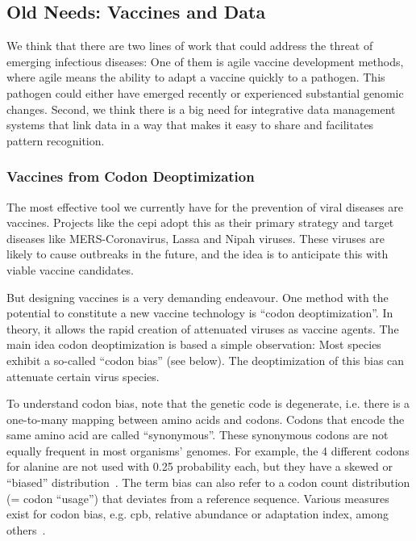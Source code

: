 \subsection{Old Needs: Vaccines and Data}

We think that there are two lines of work that could address the threat of emerging infectious diseases: One of them is agile vaccine development methods, where agile means the ability to adapt a vaccine quickly to a pathogen. This pathogen could either have emerged recently or experienced substantial genomic changes. Second, we think there is a big need for integrative data management systems that link data in a way that makes it easy to share and facilitates pattern recognition.


\subsubsection{Vaccines from Codon Deoptimization}

The most effective tool we currently have for the prevention of viral diseases are vaccines. Projects like the \gls{cepi} adopt this as their primary strategy and target diseases like MERS-Coronavirus, Lassa and Nipah viruses. These viruses are likely to cause outbreaks in the future, and the idea is to anticipate this with viable vaccine candidates.

But designing vaccines is a very demanding endeavour. One method with the potential to constitute a new vaccine technology is ``codon deoptimization''. In theory, it allows the rapid creation of attenuated viruses as vaccine agents. The main idea codon deoptimization is based a simple observation: Most species exhibit a so-called ``codon bias'' (see below). The deoptimization of this bias can attenuate certain virus species.

To understand codon bias, note that the genetic code is degenerate, i.e. there is a one-to-many mapping between amino acids and codons. Codons that encode the same amino acid are called ``synonymous''. These synonymous codons are not equally frequent in most organisms' genomes. For example, the 4 different codons for alanine are not used with 0.25 probability each, but they have a skewed or ``biased'' distribution~\cite{Plotkin2011-nk}. The term bias can also refer to a codon count distribution (= codon ``usage'') that deviates from a reference sequence. Various measures exist for codon bias, e.g. \gls{cpb}, relative abundance or adaptation index, among others~\cite{Mueller2006-fz, Coleman2008-nm, Kunec2016-ri}.

